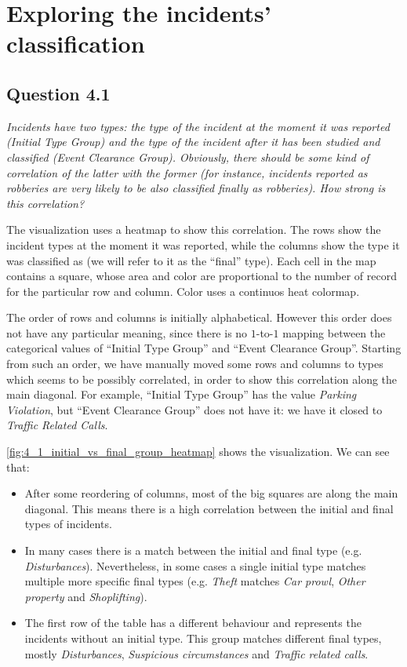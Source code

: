 \section{Exploring the incidents' classification}

\subsection*{Question 4.1}
\textit{Incidents have two types: the type of the incident at the moment it was reported (Initial Type Group) and the type of the incident after it has been studied and classified (Event Clearance Group). Obviously, there should be some kind of correlation of the latter with the former (for instance, incidents reported as robberies are very likely to be also classified finally as robberies). How strong is this correlation?}

The visualization uses a heatmap to show this correlation.
The rows show the incident types at the moment it was reported, while the columns show the type it was classified as (we will refer to it as the ``final'' type).
Each cell in the map contains a square, whose area and color are proportional to the number of record for the particular row and column.
Color uses a continuos heat colormap.

The order of rows and columns is initially alphabetical.
However this order does not have any particular meaning, since there is no $1$-to-$1$ mapping between the categorical values of ``Initial Type Group'' and ``Event Clearance Group''.
Starting from such an order, we have manually moved some rows and columns to types which seems to be possibly correlated, in order to show this correlation along the main diagonal.
For example, ``Initial Type Group'' has the value \textit{Parking Violation}, but ``Event Clearance Group'' does not have it:
we have it closed to \textit{Traffic Related Calls}.

\cref{fig:4_1_initial_vs_final_group_heatmap} shows the visualization.
We can see that:
\begin{itemize}
    \item After some reordering of columns, most of the big squares are along the main diagonal. This means there is a high correlation between the initial and final types of incidents.
    \item In many cases there is a match between the initial and final type (e.g. \textit{Disturbances}). Nevertheless, in some cases a single initial type matches multiple more specific final types (e.g. \textit{Theft} matches \textit{Car prowl}, \textit{Other property} and \textit{Shoplifting}).
    \item The first row of the table has a different behaviour and represents the incidents without an initial type. This group matches different final types, mostly \textit{Disturbances}, \textit{Suspicious circumstances} and \textit{Traffic related calls}.
\end{itemize}

